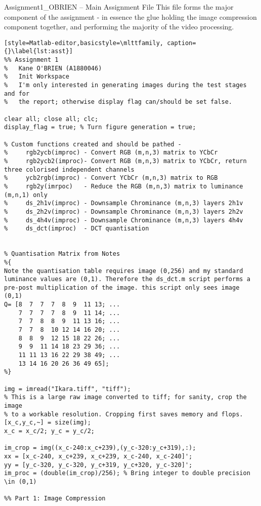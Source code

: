 \begin{codeblock}{Assignment1\_OBRIEN -- Main Assignment File}
    This file forms the major component of the assignment - in essence the glue holding the image compression component together, and performing the majority of the video processing.
        
    \begin{lstlisting}[style=Matlab-editor,basicstyle=\mlttfamily, caption={}\label{lst:asst}]   
%% Assignment 1
%   Kane O'BRIEN (A1880046)
%   Init Workspace
%   I'm only interested in generating images during the test stages and for
%   the report; otherwise display flag can/should be set false.  

clear all; close all; clc;
display_flag = true; % Turn figure generation = true;

% Custom functions created and should be pathed -
%     rgb2ycb(improc) - Convert RGB (m,n,3) matrix to YCbCr
%     rgb2ycb2(improc)- Convert RGB (m,n,3) matrix to YCbCr, return three colorised independent channels
%     ycb2rgb(improc) - Convert YCbCr (m,n,3) matrix to RGB
%     rgb2y(imrpoc)   - Reduce the RGB (m,n,3) matrix to luminance (m,n,1) only
%     ds_2h1v(improc) - Downsample Chrominance (m,n,3) layers 2h1v 
%     ds_2h2v(improc) - Downsample Chrominance (m,n,3) layers 2h2v
%     ds_4h4v(improc) - Downsample Chrominance (m,n,3) layers 4h4v
%     ds_dct(improc)  - DCT quantisation


% Quantisation Matrix from Notes 
%{
Note the quantisation table requires image (0,256) and my standard 
luminance values are (0,1). Therefore the ds_dct.m script performs a 
pre-post multiplication of the image. this script only sees image (0,1)
Q= [8  7  7  7  8  9  11 13; ...
    7  7  7  7  8  9  11 14; ...
    7  7  8  8  9  11 13 16; ...
    7  7  8  10 12 14 16 20; ...
    8  8  9  12 15 18 22 26; ...
    9  9  11 14 18 23 29 36; ...
    11 11 13 16 22 29 38 49; ...
    13 14 16 20 26 36 49 65];
%}

img = imread("Ikara.tiff", "tiff");
% This is a large raw image converted to tiff; for sanity, crop the image
% to a workable resolution. Cropping first saves memory and flops.
[x_c,y_c,~] = size(img);
x_c = x_c/2; y_c = y_c/2;

im_crop = img((x_c-240:x_c+239),(y_c-320:y_c+319),:);
xx = [x_c-240, x_c+239, x_c+239, x_c-240, x_c-240]';
yy = [y_c-320, y_c-320, y_c+319, y_c+320, y_c-320]';
im_proc = (double(im_crop)/256); % Bring integer to double precision \in (0,1)

%% Part 1: Image Compression


\end{lstlisting}
\end{codeblock}
